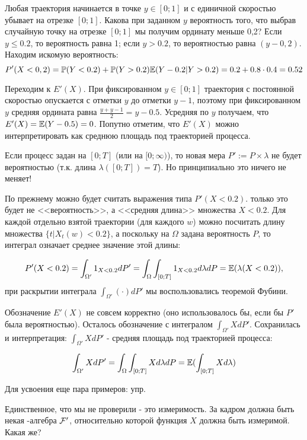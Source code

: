 {\begin{itemize}
Любая траектория начинается в точке $y\in[0;1]$ и с единичной скоростью убывает на отрезке $[0;1]$. Какова при заданном $y$ вероятность того, что выбрав случайную точку на отрезке $[0;1]$ мы получим ординату меньше 0,2? Если $y\leq 0.2$, то вероятность равна 1; если $y>0.2$, то вероятностью равна $(y-0,2)$. Находим искомую вероятность:
\begin{equation}
P'(X<0,2)=\mathbb{P}(Y<0.2)+\mathbb{P}(Y>0.2)\mathbb{E}(Y-0.2|Y>0.2)=0.2+0.8\cdot 0.4=0.52
\end{equation}

Переходим к $E'(X)$. При фиксированном $y\in[0;1]$ траектория с постоянной скоростью опускается с отметки $y$ до отметки $y-1$, поэтому при фиксированном $y$ средняя ордината равна $\frac{y+y-1}{2}=y-0.5$. Усредняя по $y$ получаем, что $E'(X)=\mathbb{E}(Y-0.5)=0$. Попутно отметим, что $E'(X)$ можно интерпретировать как среднюю площадь под траекторией процесса.
\end{itemize}

Если процесс задан на $[0;T]$ (или на $[0;\infty)$), то новая мера $P':=P\times\lambda$ не будет вероятностью (т.к. длина $\lambda([0;T])=T$). Но принципиально это ничего не меняет!

По прежнему можно будет считать выражения типа $P'(X<0.2)$. только это будет не <<вероятность>>, а <<средняя длина>> множества $X<0.2$. Для каждой отдельно взятой траектории (для каждого $w$) можно посчитать длину множества $\{t|X_{t}(w)<0.2\}$, а поскольку на $\Omega$ задана вероятность $P$, то интеграл означает среднее значение этой длины:

\begin{equation}
P'(X<0.2)=\int_{\Omega'}1_{X<0.2}dP'=\int_{\Omega}\int_{[0;T]}1_{X<0.2}d\lambda dP=\mathbb{E}(\lambda(X<0.2)),
\end{equation}
при раскрытии интеграла $\int_{\Omega'}(\cdot)dP'$ мы воспользовались теоремой Фубини.

Обозначение $E'(X)$ не совсем корректно (оно использовалось бы, если бы $P'$ была вероятностью). Осталось обозначение с интегралом $\int_{\Omega'}XdP'$. Сохранилась и интерпретация:  $\int_{\Omega'}XdP'$ - средняя площадь под траекторией процесса:

\begin{equation}
\int_{\Omega'}XdP'=\int_{\Omega}\int_{[0;T]}Xd\lambda dP=\mathbb{E}(\int_{[0;T]}Xd\lambda)
\end{equation}

Для усвоения еще пара примеров:  упр.

Единственное, что мы не проверили - это измеримость. За кадром должна быть некая \s-алгебра $\mathcal{F}'$, относительно которой функция $X$ должна быть измеримой. Какая же?

}

